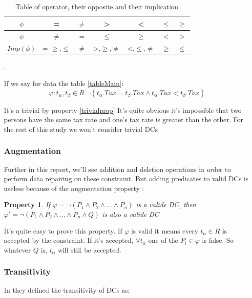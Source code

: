 \documentclass[letterpaper, 12pt]{report}
\newtheorem{myprop}{Property}
\begin{document}
\begin{table}[H]
	\centering
	\begin{tabular}{|c|c|c|c|c|c|c|}
	\hline
	   $ \phi$ & = & $\neq$ & > & < & $\leq$& $\geq$\\
	   \hline
	   $ \overline{\phi}$ & $\neq$ & = & $\leq$ & $\geq$ & < & >\\
	   \hline
	   $Imp(\phi)$ & = $\geq$,$\leq$ & $\neq$ & >,$\geq$,$\neq$ & <,$\leq$,$\neq$ & $\geq$ & $\leq$ \\
	\hline
	 
	 \hline
	\end{tabular}
	\caption{\label{tableImp} Table of operator, their opposite and their implication}.
\end{table}

If we say for data the table \ref{tableMain}:
$$\varphi : t_\alpha,t_\beta \in R \; \neg(t_\alpha.Tax = t_\beta.Tax \wedge t_\alpha.Tax < t_\beta.Tax)$$ 

It's a trivial by property \ref{trivialprop} It's quite obvious it's impossible that two persons have the same tax rate and one's tax rate is greater than the other. For the rest of this study we won't consider trivial DCs

\subsubsection{Augmentation}

Further in this report, we'll see addition and deletion operations in order to perform data repairing on these constraint. But adding predicates to valid DCs is useless because of the augmentation property \cite{DCs}:

\begin{myprop}
	If $\varphi = \neg (P_1 \wedge P_2 \wedge ... \wedge P_n)$ is a valide DC, then $\varphi ' = \neg(P_1 \wedge P_2 \wedge ... \wedge P_n \wedge Q)$ is also a valide DC
\end{myprop}

It's quite easy to prove this property. If $\varphi$ is valid it means every $t_\alpha \in R$ is accepted by the constraint. If it's accepted, $\forall t_\alpha$ one of the $P_i \in \varphi$ is false. So whatever $Q$ is, $t_\alpha$ will still be accepted.

\subsubsection{Transitivity}
In \cite{DCs} they defined the transitivity of DCs as:
\end{document}
